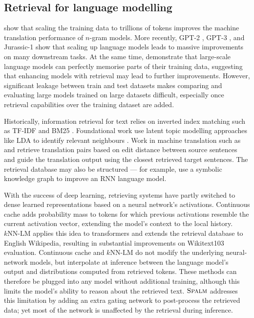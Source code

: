 \subsection{Retrieval for language modelling}

\citet{brants2007_large_language_models_in_mt} show that scaling the training data to trillions of tokens improves the machine translation performance of $n$-gram models. More recently, GPT-2 \citep{radford2019language}, GPT-3 \citep{brown2020language}, and Jurassic-1 \citep{jurassic} show that scaling up language models leads to massive improvements on many downstream tasks. At the same time, \citet{carlini2021extracting} demonstrate that large-scale language models can perfectly memorise parts of their training data, suggesting that enhancing models with retrieval may lead to further improvements. However, significant leakage between train and test datasets \citep{lee2021deduplicating, lewis2020question} makes comparing and evaluating large models trained on large datasets difficult, especially once retrieval capabilities over the training dataset are added. 

Historically, information retrieval for text relies on inverted index matching such as TF-IDF and BM25 \citep{robertson2009probabilistic}. Foundational work use latent topic modelling approaches like LDA \citep{blei_latent_2003} to identify relevant neighbours \citep{wei_lda-based_2006}. Work in machine translation such as \citet{zhang2018guiding} and \citet{gu2018search} retrieve translation pairs based on edit distance between source sentences and guide the translation output using the closest retrieved target sentences. The retrieval database may also be structured --- for example, \citet{ahn2016neural} use a symbolic knowledge graph to improve an RNN language model.

With the success of deep learning, retrieving systems have partly switched to dense learned representations based on a neural network's activations. Continuous cache \citep{grave2016improving} adds probability mass to tokens for which previous activations resemble the current activation vector, extending the model's context to the local history.
$k\textrm{NN-LM}$ \citep{khandelwal2020generalization} applies this idea to transformers and extends the retrieval database to English Wikipedia, resulting in substantial improvements on Wikitext103 evaluation. Continuous cache and $k\textrm{NN-LM}$ do not modify the underlying neural-network models, but interpolate at inference between the language model's output and distributions computed from retrieved tokens. These methods can therefore be plugged into any model without additional training, although this limits the model's ability to reason about the retrieved text.
$\textsc{Spalm}$ \citep{yogatama2021adaptive} addresses this limitation by adding an extra gating network to post-process the retrieved data; yet most of the network is unaffected by the retrieval during inference.

